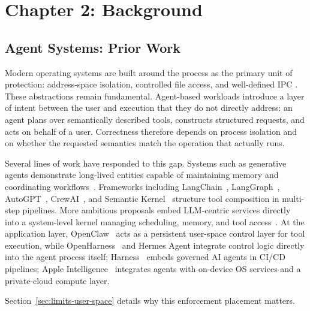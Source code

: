 \section*{Chapter 2: Background}
\setcounter{section}{2} \setcounter{subsection}{0}
 \label{chap:background} 



\subsection{Agent Systems: Prior Work}
\label{sec:agent-systems}

Modern operating systems are built around the process as the primary unit of protection: address-space isolation, controlled file access, and well-defined IPC \cite{tanenbaum2022}.
These abstractions remain fundamental.
Agent-based workloads introduce a layer of intent between the user and execution that they do not directly address: an agent plans over semantically described tools, constructs structured requests, and acts on behalf of a user.
Correctness therefore depends on process isolation and on whether the requested semantics match the operation that actually runs.

Several lines of work have responded to this gap.
Systems such as generative agents demonstrate long-lived entities capable of maintaining memory and coordinating workflows~\cite{park2023generative}.
Frameworks including LangChain~\cite{langchain2022}, LangGraph~\cite{langgraph2024}, AutoGPT~\cite{autogpt2023}, CrewAI~\cite{crewai2024}, and Semantic Kernel~\cite{semantickernel2023} structure tool composition in multi-step pipelines.
More ambitious proposals embed LLM-centric services directly into a system-level kernel managing scheduling, memory, and tool access~\cite{packer2023memgpt, wu2024oscopilot, mei2024aios, liu2026agentos}.
At the application layer, OpenClaw~\cite{openclaw2026} acts as a persistent user-space control layer for tool execution, while OpenHarness~\cite{openharness2026} and Hermes Agent \cite{nousresearch2026hermesagent} integrate control logic directly into the agent process itself; Harness~\cite{harness2025} embeds governed AI agents in CI/CD pipelines; Apple Intelligence~\cite{apple2024pcc} integrates agents with on-device OS services and a private-cloud compute layer.

Section~\ref{sec:limits-user-space} details why this enforcement placement matters.



